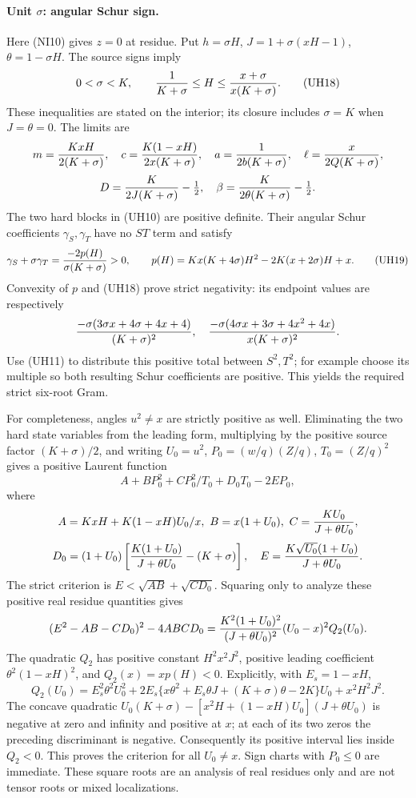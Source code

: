 \paragraph{Unit $\sigma$: angular Schur sign.}
Here (NI10) gives $z=0$ at residue. Put $h=\sigma H$,
$J=1+\sigma(xH-1)$, $\theta=1-\sigma H$. The source signs imply
\[
 0<\sigma<K,\qquad {1\over K+\sigma}\le H
       \le{x+\sigma\over x(K+\sigma)}.             \tag{UH18}
\]
These inequalities are stated on the interior; its closure includes
$\sigma=K$ when $J=\theta=0$.
The limits are
\[
 m={KxH\over2(K+\sigma)},\quad c={K(1-xH)\over2x(K+\sigma)},
 \quad a={1\over2b(K+\sigma)},\quad
 \ell={x\over2Q(K+\sigma)},
\]
\[
 D={K\over2J(K+\sigma)}-\tfrac12,
 \quad\beta={K\over2\theta(K+\sigma)}-\tfrac12.
\]
The two hard blocks in (UH10) are positive definite. Their angular
Schur coefficients $\gamma_S,\gamma_T$ have no $ST$ term and satisfy
\[
 \gamma_S+\sigma\gamma_T
 ={ -2p(H)\over\sigma(K+\sigma)}>0,\qquad
 p(H)=Kx(K+4\sigma)H^2-2K(x+2\sigma)H+x.           \tag{UH19}
\]
Convexity of $p$ and (UH18) prove strict negativity: its endpoint
values are respectively
\[
 {-\sigma(3\sigma x+4\sigma+4x+4)\over(K+\sigma)^2},\quad
 {-\sigma(4\sigma x+3\sigma+4x^2+4x)\over x(K+\sigma)^2}.
\]
Use (UH11) to distribute this positive total between $S^2,T^2$;
for example choose its multiple so both resulting Schur coefficients
are positive. This yields the required strict six-root Gram.

For completeness, angles $u^2\ne x$ are strictly positive as well.
Eliminating the two hard state variables from the leading form,
multiplying by the positive source factor $(K+\sigma)/2$, and
writing $U_0=u^2$, $P_0=(w/q)(Z/q)$, $T_0=(Z/q)^2$ gives a positive
Laurent function
\[
 A+B P_0^2+C P_0^2/T_0+D_0T_0-2E P_0,
\]
where
\[
 A=KxH+K(1-xH)U_0/x,\ B=x(1+U_0),\
 C={KU_0\over J+\theta U_0},
\]
\[
 D_0=(1+U_0)\left[{K(1+U_0)\over J+\theta U_0}-(K+\sigma)\right],
 \quad E={K\sqrt{U_0}(1+U_0)\over J+\theta U_0}.
\]
The strict criterion is $E<\sqrt{AB}+\sqrt{CD_0}$.
Squaring only to analyze these positive real residue quantities gives
\[
 (E^2-AB-CD_0)^2-4ABCD_0
 ={K^2(1+U_0)^2\over(J+\theta U_0)^2}(U_0-x)^2Q_2(U_0).
\]
The quadratic $Q_2$ has positive constant $H^2x^2J^2$, positive
leading coefficient $\theta^2(1-xH)^2$, and $Q_2(x)=xp(H)<0$.
Explicitly, with $E_s=1-xH$,
\[
 Q_2(U_0)=E_s^2\theta^2U_0^2
 +2E_s\{x\theta^2+E_s\theta J+(K+\sigma)\theta-2K\}U_0
 +x^2H^2J^2.
\]
The concave quadratic
$U_0(K+\sigma)-[x^2H+(1-xH)U_0](J+\theta U_0)$
is negative at zero and infinity and positive at $x$; at each of its
two zeros the preceding discriminant is negative. Consequently its
positive interval lies inside $Q_2<0$. This proves the criterion for
all $U_0\ne x$. Sign charts with $P_0\le0$ are immediate. These
square roots are an analysis of real residues only and are not tensor
roots or mixed localizations.

